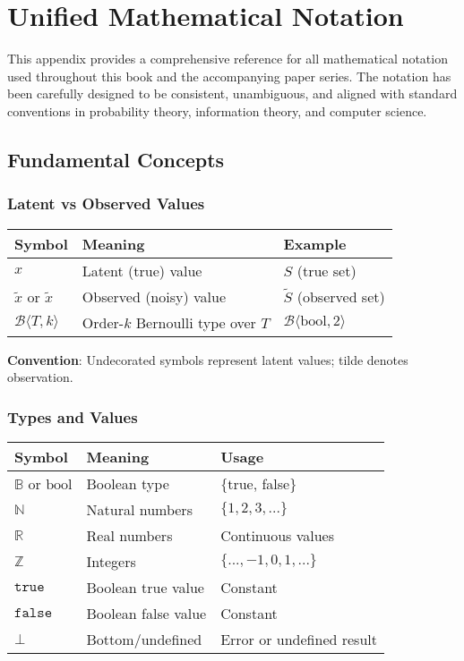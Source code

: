 \appendix
\chapter{Unified Mathematical Notation}
\label{app:notation}

This appendix provides a comprehensive reference for all mathematical notation used throughout this book and the accompanying paper series. The notation has been carefully designed to be consistent, unambiguous, and aligned with standard conventions in probability theory, information theory, and computer science.

\section{Fundamental Concepts}

\subsection{Latent vs Observed Values}

\begin{tabular}{|l|l|l|}
\hline
\textbf{Symbol} & \textbf{Meaning} & \textbf{Example} \\
\hline
$x$ & Latent (true) value & $S$ (true set) \\
$\tilde{x}$ or $\widetilde{x}$ & Observed (noisy) value & $\tilde{S}$ (observed set) \\
$\mathcal{B}\langle T, k \rangle$ & Order-$k$ Bernoulli type over $T$ & $\mathcal{B}\langle\text{bool}, 2\rangle$ \\
\hline
\end{tabular}

\textbf{Convention}: Undecorated symbols represent latent values; tilde denotes observation.

\subsection{Types and Values}

\begin{tabular}{|l|l|l|}
\hline
\textbf{Symbol} & \textbf{Meaning} & \textbf{Usage} \\
\hline
$\mathbb{B}$ or $\text{bool}$ & Boolean type & $\{$true, false$\}$ \\
$\mathbb{N}$ & Natural numbers & $\{1, 2, 3, ...\}$ \\
$\mathbb{R}$ & Real numbers & Continuous values \\
$\mathbb{Z}$ & Integers & $\{..., -1, 0, 1, ...\}$ \\
$\mathtt{true}$ & Boolean true value & Constant \\
$\mathtt{false}$ & Boolean false value & Constant \\
$\bot$ & Bottom/undefined & Error or undefined result \\
\hline
\end{tabular}

